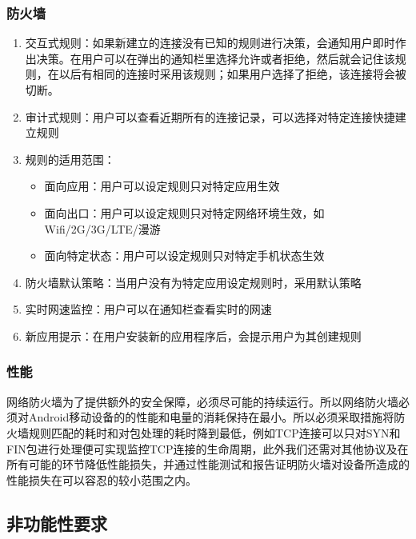 \documentclass[format=final, language=chinese, degree=bachelor]{hustthesis}
\begin{document}
\subsubsection{防火墙}
\begin{enumerate}
	\item 交互式规则：如果新建立的连接没有已知的规则进行决策，会通知用户即时作出决策。在用户可以在弹出的通知栏里选择允许或者拒绝，然后就会记住该规则，在以后有相同的连接时采用该规则；如果用户选择了拒绝，该连接将会被切断。
	\item 审计式规则：用户可以查看近期所有的连接记录，可以选择对特定连接快捷建立规则
	\item 规则的适用范围：
		\begin{itemize}
			\item 面向应用：用户可以设定规则只对特定应用生效
			\item 面向出口：用户可以设定规则只对特定网络环境生效，如Wifi/2G/3G/LTE/漫游
			\item 面向特定状态：用户可以设定规则只对特定手机状态生效
		\end{itemize}
	\item 防火墙默认策略：当用户没有为特定应用设定规则时，采用默认策略
	\item 实时网速监控：用户可以在通知栏查看实时的网速
	\item 新应用提示：在用户安装新的应用程序后，会提示用户为其创建规则
\end{enumerate}

\subsubsection{性能}

网络防火墙为了提供额外的安全保障，必须尽可能的持续运行。所以网络防火墙必须对Android移动设备的的性能和电量的消耗保持在最小。所以必须采取措施将防火墙规则匹配的耗时和对包处理的耗时降到最低，例如TCP连接可以只对SYN和FIN包进行处理便可实现监控TCP连接的生命周期，此外我们还需对其他协议及在所有可能的环节降低性能损失，并通过性能测试和报告证明防火墙对设备所造成的性能损失在可以容忍的较小范围之内。

\subsection{非功能性要求}
\end{document}
